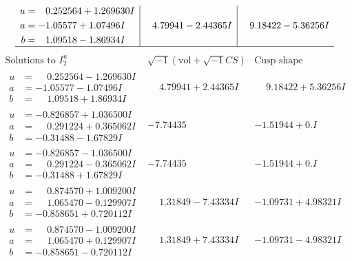 \documentclass[1p]{elsarticle_modified}
\theoremstyle{definition}
\newcommand{\I}{\sqrt{-1}}
\begin{document}
$$\begin{array}{c|c|c}
\begin{aligned}
u &= \phantom{-}0.252564 + 1.269630 I \\
a &= -1.05577 + 1.07496 I \\
b &= \phantom{-}1.09518 - 1.86934 I\end{aligned}
 & \phantom{-}4.79941 - 2.44365 I & \phantom{-}9.18422 - 5.36256 I\\
 \hline 
 \end{array}$$\newpage$$\begin{array}{c|c|c}  
\text{Solutions to }I^u_{2}& \I (\text{vol} + \sqrt{-1}CS) & \text{Cusp shape}\\
 \hline 
\begin{aligned}
u &= \phantom{-}0.252564 - 1.269630 I \\
a &= -1.05577 - 1.07496 I \\
b &= \phantom{-}1.09518 + 1.86934 I\end{aligned}
 & \phantom{-}4.79941 + 2.44365 I & \phantom{-}9.18422 + 5.36256 I \\ \hline\begin{aligned}
u &= -0.826857 + 1.036500 I \\
a &= \phantom{-}0.291224 + 0.365062 I \\
b &= -0.31488 - 1.67829 I\end{aligned}
 & -7.74435\phantom{ +0.000000I} & -1.51944 + 0. I\phantom{ +0.000000I} \\ \hline\begin{aligned}
u &= -0.826857 - 1.036500 I \\
a &= \phantom{-}0.291224 - 0.365062 I \\
b &= -0.31488 + 1.67829 I\end{aligned}
 & -7.74435\phantom{ +0.000000I} & -1.51944 + 0. I\phantom{ +0.000000I} \\ \hline\begin{aligned}
u &= \phantom{-}0.874570 + 1.009200 I \\
a &= \phantom{-}1.065470 - 0.129907 I \\
b &= -0.858651 + 0.720112 I\end{aligned}
 & \phantom{-}1.31849 - 7.43334 I & -1.09731 + 4.98321 I \\ \hline\begin{aligned}
u &= \phantom{-}0.874570 - 1.009200 I \\
a &= \phantom{-}1.065470 + 0.129907 I \\
b &= -0.858651 - 0.720112 I\end{aligned}
 & \phantom{-}1.31849 + 7.43334 I & -1.09731 - 4.98321 I \\ \hline\begin{aligned}

\end{aligned}
\end{array}$$
\end{document}
